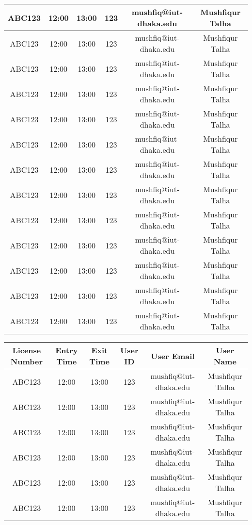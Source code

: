 \documentclass[12pt,notitle]{article}
\begin{document}
\begin{center}
\begin{tabular}{|c|c|c|c|c|c|}
\hline
ABC123 & 12:00 & 13:00 & 123 & mushfiq@iut-dhaka.edu & Mushfiqur Talha \\
\hline
ABC123 & 12:00 & 13:00 & 123 & mushfiq@iut-dhaka.edu & Mushfiqur Talha \\
\hline
ABC123 & 12:00 & 13:00 & 123 & mushfiq@iut-dhaka.edu & Mushfiqur Talha \\
\hline
ABC123 & 12:00 & 13:00 & 123 & mushfiq@iut-dhaka.edu & Mushfiqur Talha \\
\hline
ABC123 & 12:00 & 13:00 & 123 & mushfiq@iut-dhaka.edu & Mushfiqur Talha \\
\hline
ABC123 & 12:00 & 13:00 & 123 & mushfiq@iut-dhaka.edu & Mushfiqur Talha \\
\hline
ABC123 & 12:00 & 13:00 & 123 & mushfiq@iut-dhaka.edu & Mushfiqur Talha \\
\hline
ABC123 & 12:00 & 13:00 & 123 & mushfiq@iut-dhaka.edu & Mushfiqur Talha \\
\hline
ABC123 & 12:00 & 13:00 & 123 & mushfiq@iut-dhaka.edu & Mushfiqur Talha \\
\hline
ABC123 & 12:00 & 13:00 & 123 & mushfiq@iut-dhaka.edu & Mushfiqur Talha \\
\hline
ABC123 & 12:00 & 13:00 & 123 & mushfiq@iut-dhaka.edu & Mushfiqur Talha \\
\hline
ABC123 & 12:00 & 13:00 & 123 & mushfiq@iut-dhaka.edu & Mushfiqur Talha \\
\hline
ABC123 & 12:00 & 13:00 & 123 & mushfiq@iut-dhaka.edu & Mushfiqur Talha \\
\hline
\end{tabular}
\begin{tabular}{|c|c|c|c|c|c|}
\hline
\textbf{License Number} & \textbf{Entry Time} & \textbf{Exit Time} & \textbf{User ID} & \textbf{User Email} & \textbf{User Name} \\
\hline\hline
ABC123 & 12:00 & 13:00 & 123 & mushfiq@iut-dhaka.edu & Mushfiqur Talha \\
\hline
ABC123 & 12:00 & 13:00 & 123 & mushfiq@iut-dhaka.edu & Mushfiqur Talha \\
\hline
ABC123 & 12:00 & 13:00 & 123 & mushfiq@iut-dhaka.edu & Mushfiqur Talha \\
\hline
ABC123 & 12:00 & 13:00 & 123 & mushfiq@iut-dhaka.edu & Mushfiqur Talha \\
\hline
ABC123 & 12:00 & 13:00 & 123 & mushfiq@iut-dhaka.edu & Mushfiqur Talha \\
\hline
ABC123 & 12:00 & 13:00 & 123 & mushfiq@iut-dhaka.edu & Mushfiqur Talha \\

\end{tabular}
\end{center}
\end{document}
